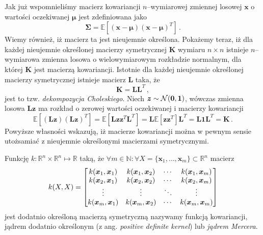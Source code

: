 \documentclass{myclass}
\numberwithin{equation}{subsection}
\begin{document}
Jak już wspomnieliśmy macierz kowariancji \(n\)--wymiarowej zmiennej losowej \(\bm{x}\) o wartości
oczekiwanej \(\bm{\mu}\) jest zdefiniowana jako
\[
\bm{\Sigma} = \mathbb{E}\left[(\bm{x} - \bm{\mu})(\bm{x} - \bm{\mu})^T\right]\,.
\]
Wiemy również, iż macierz ta jest nieujemnie określona. Pokażemy teraz, iż dla każdej nieujemnie
określonej macierzy symetrycznej \(\bm{K}\) wymiaru \(n\times n\) istnieje \(n\)--wymiarowa zmienna
losowa o wielowymiarowym rozkładzie normalnym, dla której \(\bm{K}\) jest macierzą kowariancji.
Istotnie dla każdej nieujemnie określonej macierzy symetrycznej istnieje macierz \(\bm{L}\) taka, że
\[
\bm{K} = \bm{L}\bm{L}^T\,,
\]
jest to tzw. \emph{dekompozycja Choleskiego}. Niech \(\bm{z} \sim \mathcal{N}(\bm{0}, \bm{1})\), wówczas
zmienna losowa \(\bm{L}\bm{z}\) ma rozkład o zerowej wartości oczekiwanej i macierzy kowariancji
\[
\mathbb{E}\left[(\bm{L}\bm{z})(\bm{L}\bm{z})^T\right] = \mathbb{E}\left[\bm{L}\bm{z}\bm{z}^T\bm{L}^T\right] = \bm{L}\mathbb{E}[\bm{z}\bm{z}^T]\bm{L}^T = \bm{L}\bm{1}\bm{L}^T = \bm{K}\,.
\]
Powyższe własności wskazują, iż macierze kowariancji można w pewnym sensie utożsamiać z nieujemnie
określonymi macierzami symetrycznymi.

\begin{definition}
Funkcję \(k: \mathbb{R}^n\times\mathbb{R}^n\mapsto\mathbb{R}\) taką, że \(\forall m\in\mathbb{N} :
\forall X = \{\bm{x}_1,\ldots,\bm{x}_m\} \subset \mathbb{R}^n\) macierz
\[
k(X,X) = \mqty[k(\bm{x}_1, \bm{x}_1) & k(\bm{x}_1, \bm{x}_2) & \cdots & k(\bm{x}_1, \bm{x}_m)\\
k(\bm{x}_2, \bm{x}_1) & k(\bm{x}_2, \bm{x}_2) & \cdots & k(\bm{x}_2, \bm{x}_m)\\
\vdots & \vdots & \ddots & \vdots\\
k(\bm{x}_m, \bm{x}_1) & k(\bm{x}_m, \bm{x}_2) & \cdots & k(\bm{x}_m, \bm{x}_m)\\]
\]
jest dodatnio określoną macierzą symetryczną nazywamy funkcją kowariancji, jądrem dodatnio
określonym (z ang. \textit{positive definite kernel}) lub \emph{jądrem Mercera}.
\end{definition}
\end{document}
